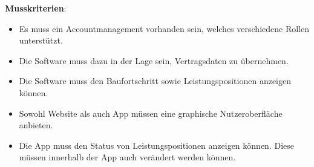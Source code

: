 
\textbf{Musskriterien}:
\begin{itemize}
	\item Es muss ein Accountmanagement vorhanden sein, welches verschiedene Rollen unterstützt.
	\item Die Software muss dazu in der Lage sein, Vertragsdaten zu übernehmen.
	\item Die Software muss den Baufortschritt sowie Leistungspositionen anzeigen können.
	\item Sowohl Website als auch App müssen eine graphische Nutzeroberfläche anbieten.
	\item Die App muss den Status von Leistungspositionen anzeigen können.
	Diese müssen innerhalb der App auch verändert werden können.
\end{itemize}

